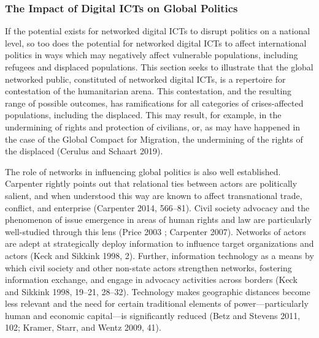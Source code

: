 \documentclass[
]{article}
\begin{document}
\hypertarget{the-impact-of-digital-icts-on-global-politics}{%
\subsubsection{The Impact of Digital ICTs on Global
Politics}\label{the-impact-of-digital-icts-on-global-politics}}

If the potential exists for networked digital ICTs to disrupt politics
on a national level, so too does the potential for networked digital
ICTs to affect international politics in ways which may negatively
affect vulnerable populations, including refugees and displaced
populations. This section seeks to illustrate that the global networked
public, constituted of networked digital ICTs, is a repertoire for
contestation of the humanitarian arena. This contestation, and the
resulting range of possible outcomes, has ramifications for all
categories of crises-affected populations, including the displaced. This
may result, for example, in the undermining of rights and protection of
civilians, or, as may have happened in the case of the Global Compact
for Migration, the undermining of the rights of the displaced (Cerulus
and Schaart 2019).

The role of networks in influencing global politics is also well
established. Carpenter rightly points out that relational ties between
actors are politically salient, and when understood this way are known
to affect transnational trade, conflict, and enterprise (Carpenter 2014,
566--81). Civil society advocacy and the phenomenon of issue emergence
in areas of human rights and law are particularly well-studied through
this lens (Price 2003 ; Carpenter 2007). Networks of actors are adept at
strategically deploy information to influence target organizations and
actors (Keck and Sikkink 1998, 2). Further, information technology as a
means by which civil society and other non-state actors strengthen
networks, fostering information exchange, and engage in advocacy
activities across borders (Keck and Sikkink 1998, 19--21, 28--32).
Technology makes geographic distances become less relevant and the need
for certain traditional elements of power---particularly human and
economic capital---is significantly reduced (Betz and Stevens 2011, 102;
Kramer, Starr, and Wentz 2009, 41).
\end{document}
